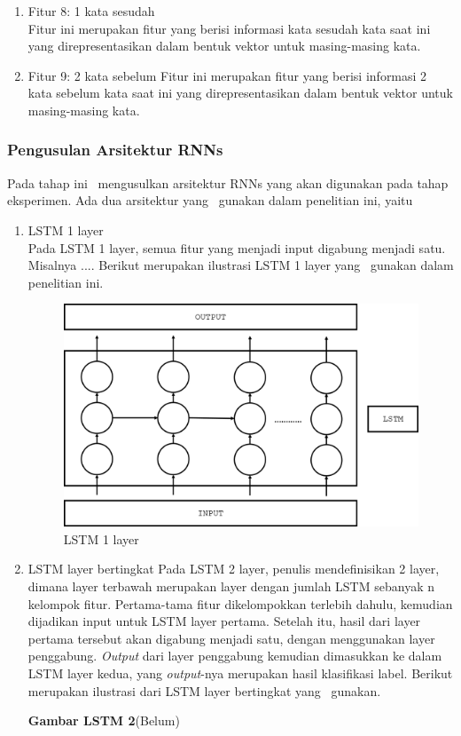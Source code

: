 \begin{enumerate}
		 \item Fitur 8: 1 kata sesudah\\
		 Fitur ini merupakan fitur yang berisi informasi kata sesudah kata saat ini yang direpresentasikan dalam bentuk vektor untuk masing-masing kata.
		 
		 \item Fitur 9: 2 kata sebelum
		 Fitur ini merupakan fitur yang berisi informasi 2 kata sebelum kata saat ini yang direpresentasikan dalam bentuk vektor untuk masing-masing kata.
		 
	\end{enumerate}

	\subsubsection{Pengusulan Arsitektur RNNs}
	Pada tahap ini \saya~mengusulkan arsitektur RNNs yang akan digunakan pada tahap eksperimen. Ada dua arsitektur yang \saya~gunakan dalam penelitian ini, yaitu
	\begin{enumerate}
		\item LSTM 1 layer\\
		Pada LSTM 1 layer, semua fitur yang menjadi input digabung menjadi satu. Misalnya .... Berikut merupakan ilustrasi LSTM 1 layer yang \saya~gunakan dalam penelitian ini.
		
		\begin{figure}
			\centering
			\includegraphics[width=0.8\linewidth]{images/single_layer_rnn}
			\caption{LSTM 1 layer}
			\label{fig:single_layer_rnn}
		\end{figure}
	
		\item LSTM layer bertingkat
		Pada LSTM 2 layer, penulis mendefinisikan 2 layer, dimana layer terbawah merupakan layer dengan jumlah LSTM sebanyak n kelompok fitur. Pertama-tama fitur dikelompokkan terlebih dahulu, kemudian dijadikan input untuk LSTM layer pertama. Setelah itu, hasil dari layer pertama tersebut akan digabung menjadi satu, dengan menggunakan layer penggabung. \textit{Output} dari layer penggabung kemudian dimasukkan ke dalam LSTM layer kedua, yang \textit{output}-nya merupakan hasil klasifikasi label. Berikut merupakan ilustrasi dari LSTM layer bertingkat yang \saya~gunakan.
		
		\textbf{Gambar LSTM 2}(Belum)
		
	\end{enumerate}
	
